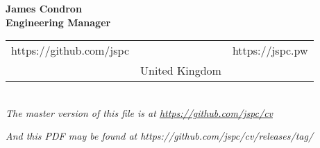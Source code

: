 \begin{center}
  {\huge\textbf{James Condron}}\\
  \textbf{Engineering Manager} \\

  \begin{tabular}{rcl}
    https://github.com/jspc & & https://jspc.pw \\
    & United Kingdom &
  \end{tabular} \\

  {\footnotesize\textit{The master version of this file is at \url{https://github.com/jspc/cv}}}

  {\footnotesize\textit{And this PDF may be found at https://github.com/jspc/cv/releases/tag/}}%
  {}

\end{center}
